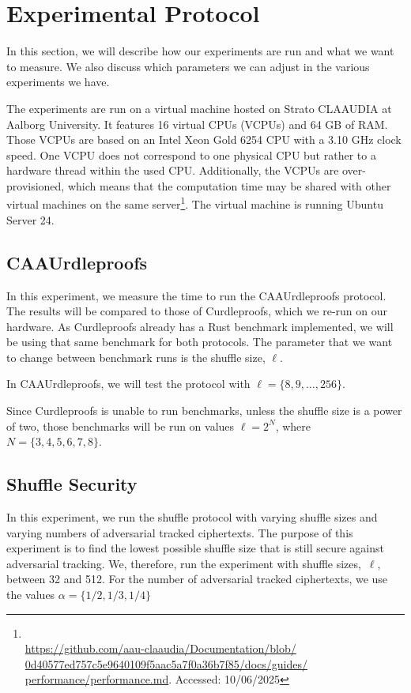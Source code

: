 
\section{Experimental Protocol}\label{sec:experimental-protocol}
In this section, we will describe how our experiments are run and what we want to measure.
We also discuss which parameters we can adjust in the various experiments we have.

The experiments are run on a virtual machine hosted on Strato CLAAUDIA at Aalborg University.
It features 16 virtual CPUs (VCPUs) and 64 GB of RAM\@.
Those VCPUs are based on an Intel Xeon Gold 6254 CPU with a 3.10 GHz clock speed.
One VCPU does not correspond to one physical CPU but rather to a hardware thread within the used CPU\@.
Additionally, the VCPUs are over-provisioned, which means that the computation time may be shared with other virtual machines on the same server\footnote{\\ \href{https://github.com/aau-claaudia/Documentation/blob/0d40577ed757c5e9640109f5aac5a7f0a36b7f85/docs/guides/performance/performance.md}{https://github.com/aau-claaudia/Documentation/blob/\\0d40577ed757c5e9640109f5aac5a7f0a36b7f85/docs/guides/\\performance/performance.md}. Accessed: 10/06/2025}.
The virtual machine is running Ubuntu Server 24.


\subsection{CAAUrdleproofs}\label{sec:CAAUrdleproof-experiment}
In this experiment, we measure the time to run the CAAUrdleproofs protocol.
The results will be compared to those of Curdleproofs, which we re-run on our hardware.
As Curdleproofs already has a Rust benchmark implemented, we will be using that same benchmark for both protocols.
The parameter that we want to change between benchmark runs is the shuffle size, $\ell$.

In CAAUrdleproofs, we will test the protocol with $\ell=\{8,9,\dots,256\}$.

Since Curdleproofs is unable to run benchmarks, unless the shuffle size is a power of two, those benchmarks will be run on values $\ell=2^N$, where $N=\{3,4,5,6,7,8\}$.




\subsection{Shuffle Security}\label{subsec:experimental-protocol-shuffle-security}
In this experiment, we run the shuffle protocol with varying shuffle sizes and varying numbers of adversarial tracked ciphertexts.
The purpose of this experiment is to find the lowest possible shuffle size that is still secure against adversarial tracking.
We, therefore, run the experiment with shuffle sizes,~$\ell$, between 32 and 512.
For the number of adversarial tracked ciphertexts, we use the values $\alpha=\{1/2,1/3,1/4\}$

